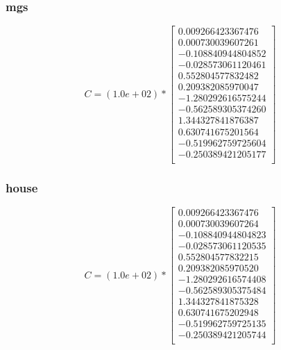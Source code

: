 \documentclass{article}
\begin{document}
            \subsubsection*{mgs}
            \[
                C = (1.0e+02) * \left[
                \begin{array}{c}
                    0.009266423367476\\
                    0.000730039607261\\
                    -0.108840944804852\\
                    -0.028573061120461\\
                    0.552804577832482\\
                    0.209382085970047\\
                    -1.280292616575244\\
                    -0.562589305374260\\
                    1.344327841876387\\
                    0.630741675201564\\
                    -0.519962759725604\\
                    -0.250389421205177\\
                \end{array}
                \right]
            \]
            \subsubsection*{house}
            \[
                C = (1.0e+02) * \left[
                \begin{array}{c}
                    0.009266423367476\\
                    0.000730039607264\\
                    -0.108840944804823\\
                    -0.028573061120535\\
                    0.552804577832215\\
                    0.209382085970520\\
                    -1.280292616574408\\
                    -0.562589305375484\\
                    1.344327841875328\\
                    0.630741675202948\\
                    -0.519962759725135\\
                    -0.250389421205744\\
                \end{array}
                \right]
            \]
\end{document}
